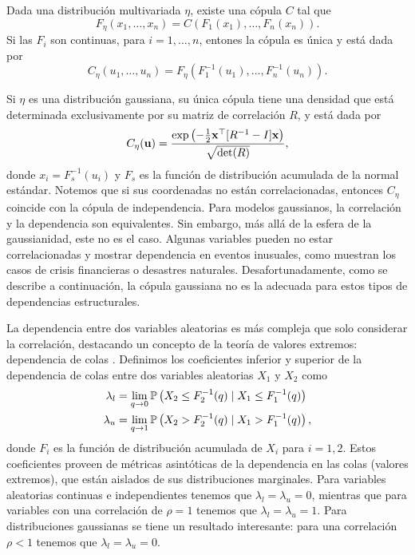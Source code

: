\begin{theorem}[Sklar]
	Dada una distribución multivariada \(\eta\), existe una cópula \(C\) tal que
	\[F_{\eta}(x_{1}, \dotsc, x_{n}) = C(F_{1}(x_{1}), \dotsc, F_{n}(x_{n})).\]
	Si las \(F_i\) son continuas, para \(i = 1, \dotsc, n\), entones la cópula es única y está dada por
	\[C_{\eta}(u_{1}, \dotsc, u_{n}) = F_{\eta}(F^{-1}_{1}(u_{1}), \dotsc, F^{-1}_{n}(u_{n})).\]
\end{theorem}

Si \(\eta\) es una distribución gaussiana, su única cópula tiene una densidad que está determinada exclusivamente por su matriz de correlación \(R\), y está dada por
\[C_{\eta}(\mathbf{u}) = \frac{\exp \left(-\frac{1}{2} \mathbf{x}^{\top} [R^{-1} - I] \mathbf{x}\right)}{\sqrt{\det(R)}},\]
donde \(x_i = F_{s}^{-1}(u_i)\) y \(F_{s}\) es la función de distribución acumulada de la normal estándar. Notemos que si sus coordenadas no están correlacionadas, entonces \(C_\eta\) coincide con la cópula de independencia. Para modelos gaussianos, la correlación y la dependencia son equivalentes. Sin embargo, más allá de la esfera de la gaussianidad, este no es el caso. Algunas variables pueden no estar correlacionadas y mostrar dependencia en eventos inusuales, como muestran los casos de crisis financieras o desastres naturales. Desafortunadamente, como se describe a continuación, la cópula gaussiana no es la adecuada para estos tipos de dependencias estructurales.

La dependencia entre dos variables aleatorias es más compleja que solo considerar la correlación, destacando un concepto de la teoría de valores extremos: dependencia de colas \cite{coles2001introduction}. Definimos los coeficientes inferior y superior de la dependencia de colas \cite{schmidt2005tail} entre dos variables aleatorias \(X_{1}\) y \(X_{2}\) como
\begin{align*}
	\lambda_{l}	&= \lim_{q \to 0} \mathbb{P}\left(X_{2} \leq F_{2}^{-1}(q) \mid X_{1} \leq F_{1}^{-1}(q)\right)\\
	\lambda_{u}	&= \lim_{q \to 1} \mathbb{P}\left(X_{2} > F_{2}^{-1}(q) \mid X_{1} > F_{1}^{-1}(q)\right),
\end{align*}
donde \(F_i\) es la función de distribución acumulada de \(X_i\) para \(i = 1, 2\). Estos coeficientes proveen de métricas asintóticas de la dependencia en las colas (valores extremos), que están aislados de sus distribuciones marginales. Para variables aleatorias continuas e independientes tenemos que \(\lambda_{l} = \lambda_{u} = 0\), mientras que para variables con una correlación de \(\rho = 1\) tenemos que \(\lambda_{l} = \lambda_{u} = 1\). Para distribuciones gaussianas se tiene un resultado interesante: para una correlación \(\rho < 1\) tenemos que \(\lambda_{l} = \lambda_{u} = 0\).

